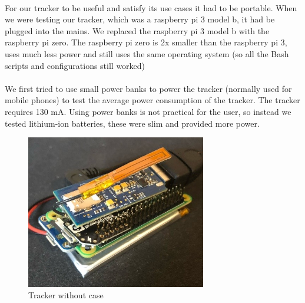 \documentclass[12pt,a4paper]{article}
\begin{document}
        \paragraph{} For our tracker to be useful and satisfy its use cases it had to be portable. When we were testing our tracker, which was a raspberry pi 3 model b, it had be plugged into the mains. We replaced the raspberry pi 3 model b with the raspberry pi zero. The raspberry pi zero is 2x smaller than the raspberry pi 3, uses much less power and still uses the same operating system (so all the Bash scripts and configurations still worked) 
        
        \paragraph{} We first tried to use small power banks to power the tracker (normally used for mobile phones) to test the average power consumption of the tracker. The tracker requires 130 mA. Using power banks is not practical for the user, so instead we tested lithium-ion batteries, these were slim and provided more power. 
        
        
      
        \begin{figure}[H]
          \centering
          \includegraphics[width=0.7\textwidth]{../assets/design-tracker-without-case.jpg}
          \caption{Tracker without case}
          \label{fig:Tracker without case}
        \end{figure}
\end{document}
